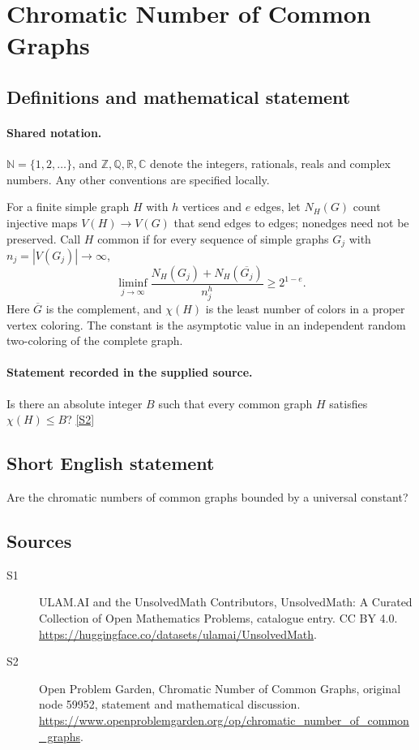 \documentclass[11pt]{article}
\newcommand{\sref}[2]{\hyperlink{source:#1:#2}{[S#2]}}
\begin{document}
\section{Chromatic Number of Common Graphs}\label{statement}

\subsection{Definitions and mathematical statement}

\paragraph{Shared notation.}$\mathbb N=\{1,2,\ldots\}$, and $\mathbb Z,\mathbb Q,\mathbb R,\mathbb C$ denote the integers, rationals, reals and complex numbers. Any other conventions are specified locally.


For a finite simple graph $H$ with $h$ vertices and $e$ edges, let $N_H(G)$ count injective maps $V(H)\to V(G)$ that send edges to edges; nonedges need not be preserved. Call $H$ common if for every sequence of simple graphs $G_j$ with $n_j=|V(G_j)|\to\infty$, \[\liminf_{j\to\infty}\frac{N_H(G_j)+N_H(\overline{G_j})}{n_j^h}\ge 2^{1-e}.\] Here $\overline G$ is the complement, and $\chi(H)$ is the least number of colors in a proper vertex coloring. The constant is the asymptotic value in an independent random two-coloring of the complete graph.
\paragraph{Statement recorded in the supplied source.}
Is there an absolute integer $B$ such that every common graph $H$ satisfies $\chi(H)\le B$? \sref{statement}{2}
\subsection{Short English statement}
Are the chromatic numbers of common graphs bounded by a universal constant?
\subsection{Sources}
\begin{description}
\item[\hypertarget{source:statement:1}{S1}] ULAM.AI and the UnsolvedMath Contributors, UnsolvedMath: A Curated Collection of Open Mathematics Problems, catalogue entry. CC BY 4.0. \url{https://huggingface.co/datasets/ulamai/UnsolvedMath}.
\item[\hypertarget{source:statement:2}{S2}] Open Problem Garden, Chromatic Number of Common Graphs, original node 59952, statement and mathematical discussion. \url{https://www.openproblemgarden.org/op/chromatic_number_of_common_graphs}.
\end{description}
\label{end:statement}
\end{document}
